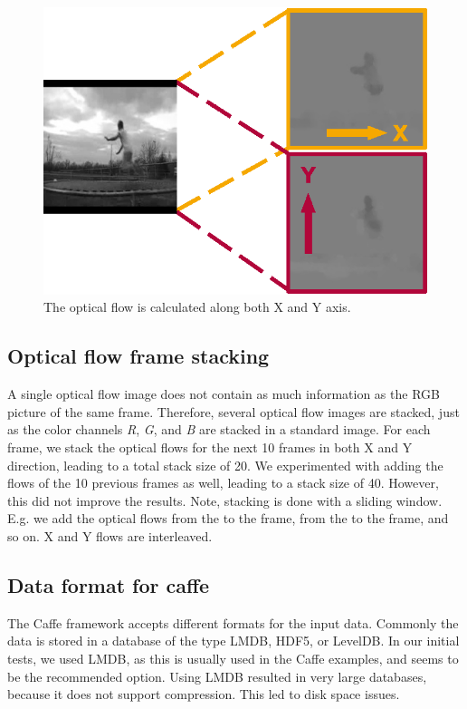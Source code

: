 \begin{figure}[!htb]
        \centering
        \includegraphics[scale=.7]{images/optical_flow.eps}
        \caption{The optical flow is calculated along both X and Y axis.}
        \label{fig:optical_flow}
\end{figure}

\subsection{Optical flow frame stacking}
A single optical flow image does not contain as much information as the RGB picture of the same frame.
Therefore, several optical flow images are stacked, just as the color channels \emph{R}, \emph{G}, and \emph{B} are stacked in a standard image.
For each frame, we stack the optical flows for the next 10 frames in both X and Y direction, leading to a total stack size of 20.
We experimented with adding the flows of the 10 previous frames as well, leading to a stack size of 40.
However, this did not improve the results.
Note, stacking is done with a sliding window. E.g. we add the optical flows from the  to the  frame, from the  to the  frame, and so on. X and Y flows are interleaved.


\subsection{Data format for caffe}
The Caffe framework accepts different formats for the input data. Commonly the data is stored in a database of the type LMDB, HDF5, or LevelDB.
In our initial tests, we used LMDB, as this is usually used in the Caffe examples, and seems to be the recommended option.
Using LMDB resulted in very large databases, because it does not support compression.
This led to disk space issues.

